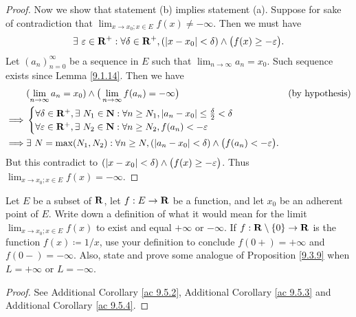 \begin{proof}
    Now we show that statement (b) implies statement (a).
    Suppose for sake of contradiction that \(\lim_{x \to x_0 ; x \in E} f(x) \neq -\infty\).
    Then we must have
    \[
        \exists\ \varepsilon \in \mathbf{R}^+ : \forall \delta \in \mathbf{R}^+, (\left\lvert x - x_0\right\rvert < \delta) \land \big(f(x) \geq -\varepsilon\big).
    \]
    Let \((a_n)_{n = 0}^\infty\) be a sequence in \(E\) such that \(\lim_{n \to \infty} a_n = x_0\).
    Such sequence exists since Lemma \ref{9.1.14}.
    Then we have
    \begin{align*}
                 & (\lim_{n \to \infty} a_n = x_0) \land \big(\lim_{n \to \infty} f(a_n) = -\infty\big)                                 & \text{(by hypothesis)} \\
        \implies & \begin{cases}
                       \forall \delta \in \mathbf{R}^+, \exists\ N_1 \in \mathbf{N} : \forall n \geq N_1, \left\lvert a_n - x_0\right\rvert \leq \frac{\delta}{2} < \delta \\
                       \forall \varepsilon \in \mathbf{R}^+, \exists\ N_2 \in \mathbf{N} : \forall n \geq N_2, f(a_n) < -\varepsilon
                   \end{cases}                             \\
        \implies & \exists\ N = \max(N_1, N_2) : \forall n \geq N, (\left\lvert a_n - x_0\right\rvert < \delta) \land \big(f(a_n) < -\varepsilon\big).
    \end{align*}
    But this contradict to \((\left\lvert x - x_0\right\rvert < \delta) \land \big(f(x) \geq -\varepsilon\big)\).
    Thus \(\lim_{x \to x_0 ; x \in E} f(x) = -\infty\).
\end{proof}

\exercisesection

\begin{exercise}\label{ex 9.5.1}
    Let \(E\) be a subset of \(\mathbf{R}\), let \(f : E \to \mathbf{R}\) be a function, and let \(x_0\) be an adherent point of \(E\).
    Write down a definition of what it would mean for the limit \(\lim_{x \to x_0 ; x \in E} f(x)\) to exist and equal \(+\infty\) or \(-\infty\).
    If \(f : \mathbf{R} \setminus \{0\} \to \mathbf{R}\) is the function \(f(x) \coloneqq 1 / x\), use your definition to conclude \(f(0+) = +\infty\) and \(f(0-) = -\infty\).
    Also, state and prove some analogue of Proposition \ref{9.3.9} when \(L = +\infty\) or \(L = -\infty\).
\end{exercise}

\begin{proof}
    See Additional Corollary \ref{ac 9.5.2}, Additional Corollary \ref{ac 9.5.3} and Additional Corollary \ref{ac 9.5.4}.
\end{proof}